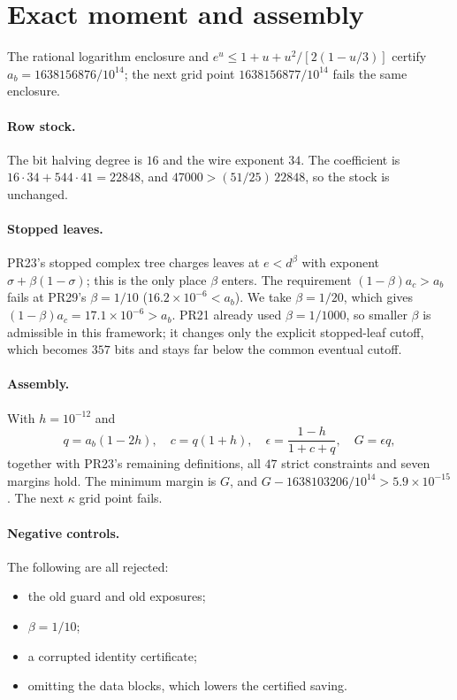 \documentclass[11pt]{article}
\begin{document}
\section{Exact moment and assembly}
The rational logarithm enclosure and $e^u\le1+u+u^2/[2(1-u/3)]$ certify
$a_b=1638156876/10^{14}$; the next grid point $1638156877/10^{14}$ fails the
same enclosure.

\paragraph{Row stock.} The bit halving degree is $16$ and the wire
exponent $34$. The coefficient is $16\cdot34+544\cdot41=22848$, and
$47000>(51/25)\,22848$, so the stock is unchanged.

\paragraph{Stopped leaves.} PR23's stopped complex tree charges leaves at
$e<d^\beta$ with exponent $\sigma+\beta(1-\sigma)$; this is the only place
$\beta$ enters. The requirement $(1-\beta)a_c>a_b$ fails at PR29's
$\beta=1/10$ ($16.2\times10^{-6}<a_b$). We take $\beta=1/20$, which gives
$(1-\beta)a_c=17.1\times10^{-6}>a_b$. PR21 already used $\beta=1/1000$, so
smaller $\beta$ is admissible in this framework; it changes only the
explicit stopped-leaf cutoff, which becomes $357$ bits and stays far below
the common eventual cutoff.

\paragraph{Assembly.} With $h=10^{-12}$ and
\[
q=a_b(1-2h),\quad c=q(1+h),\quad \epsilon=\frac{1-h}{1+c+q},\quad
G=\epsilon q,
\]
together with PR23's remaining definitions, all $47$ strict constraints
and seven margins hold. The minimum margin is $G$, and
$G-1638103206/10^{14}>5.9\times10^{-15}$. The next $\kappa$ grid point fails.

\paragraph{Negative controls.} The following are all rejected:
\begin{itemize}
\item the old guard and old exposures;
\item $\beta=1/10$;
\item a corrupted identity certificate;
\item omitting the data blocks, which lowers the certified saving.
\end{itemize}
\end{document}
